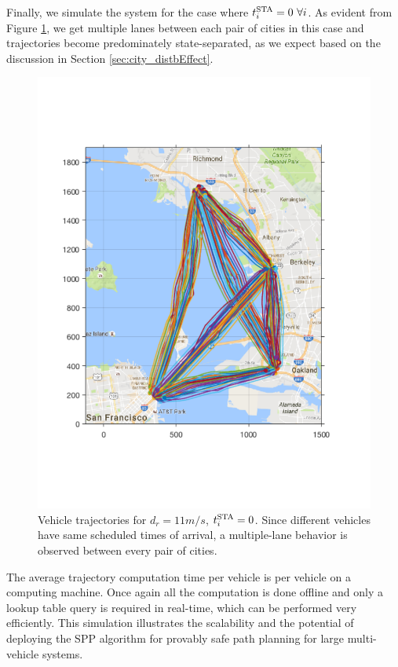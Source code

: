Finally, we simulate the system for the case where $t^\text{STA}_i = 0 ~\forall i$. As evident from Figure \ref{fig:bayArea_d11sep0}, we get multiple lanes between each pair of cities in this case and trajectories become predominately state-separated, as we expect based on the discussion in Section \ref{sec:city_distbEffect}.
\begin{figure}[t]
  \centering
  \includegraphics[width=\columnwidth]{"figs/bayArea_d11sep0"}
  \caption{Vehicle trajectories for $d_r = 11m/s$, $t^\text{STA}_i = 0$. Since different vehicles have same scheduled times of arrival, a multiple-lane behavior is observed between every pair of cities.} 
  \label{fig:bayArea_d11sep0}
\end{figure}

The average trajectory computation time per vehicle is  per vehicle on a  computing machine. Once again all the computation is done offline and only a lookup table query is required in real-time, which can be performed very efficiently. This simulation illustrates the scalability and the potential of deploying the SPP algorithm for provably safe path planning for large multi-vehicle systems.